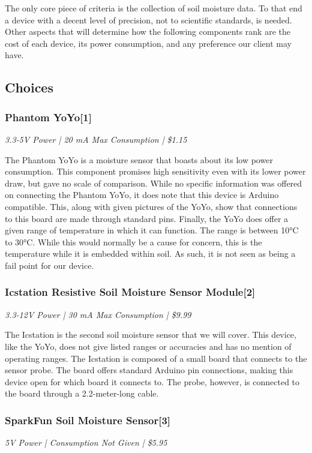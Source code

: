 \documentclass[IEEEtran,letterpaper,10pt,titlepage,fleqn,draftclsnofoot,onecolumn]{article}
\begin{document}
The only core piece of criteria is the collection of soil moisture data. To that end a device with a decent level of precision, not to scientific standards, is needed. Other aspects that will determine how the following components rank are the cost of each device, its power consumption, and any preference our client may have. 

\subsection{Choices}
\subsubsection{Phantom YoYo[1]}
\textit{3.3-5V Power | 20 mA Max Consumption | \$1.15}

\vspace{1mm}

The Phantom YoYo is a moisture sensor that boasts about its low power consumption. This component promises high sensitivity even with its lower power draw, but gave no scale of comparison. While no specific information was offered on connecting the Phantom YoYo, it does note that this device is Arduino compatible. This, along with given pictures of the YoYo, show that connections to this board are made through standard pins. Finally, the YoYo does offer a given range of temperature in which it can function. The range is between 10°C to 30°C. While this would normally be a cause for concern, this is the temperature while it is embedded within soil. As such, it is not seen as being a fail point for our device.

\subsubsection{Icstation Resistive Soil Moisture Sensor Module[2]}
\textit{3.3-12V Power | 30 mA Max Consumption | \$9.99}

\vspace{1mm}

The Icstation is the second soil moisture sensor that we will cover. This device, like the YoYo, does not give listed ranges or accuracies and has no mention of operating ranges. The Icstation is composed of a small board that connects to the sensor probe. The board offers standard Arduino pin connections, making this device open for which board it connects to. The probe, however, is connected to the board through a 2.2-meter-long cable. 

\subsubsection{SparkFun Soil Moisture Sensor[3]}
\textit{5V Power | Consumption Not Given | \$5.95}
\end{document}
